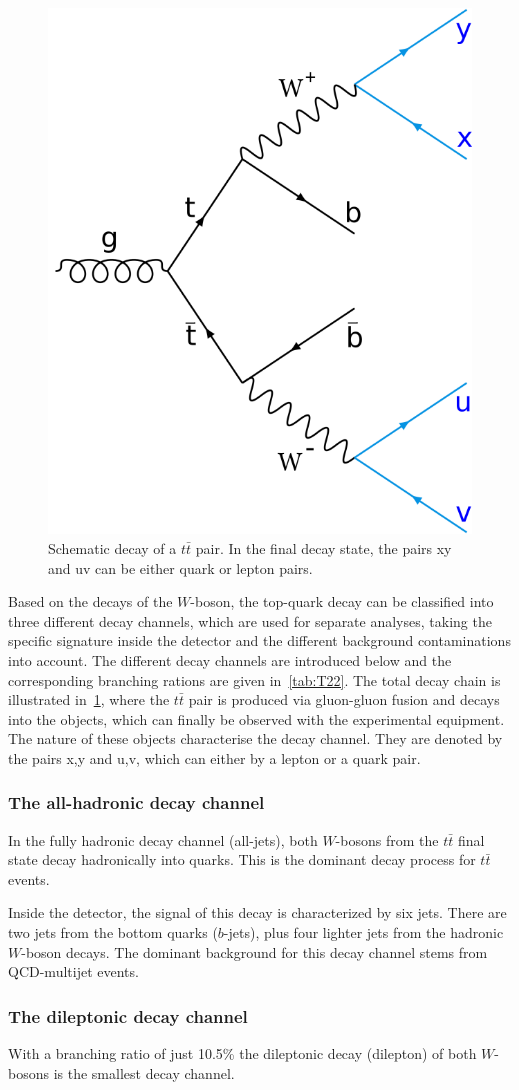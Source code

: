 \begin{figure}[h]
	\centering
	\includegraphics[width=0.3\linewidth]{Pics/cp1/Decay}
	\caption{Schematic decay of a $t\bar{t}$ pair. In the final decay state, the pairs xy and uv can be either quark or lepton pairs.  }
	\label{fig:Decay}
\end{figure}

 Based on the decays of the $W$-boson, the top-quark decay can be classified into three different decay channels, which are used for separate analyses, taking the specific signature inside the detector and the different background contaminations into account. The different decay channels are introduced below and  the corresponding branching rations are given in~\cref{tab:T22}. The total decay chain is illustrated in~\cref{fig:Decay}, where the  $t\bar{t}$ pair is produced via  gluon-gluon fusion and  decays into the objects, which can finally be observed with the experimental equipment. The nature of these objects characterise the decay channel. They are denoted by the pairs x,y and u,v, which can either by a lepton or a quark pair.




\subsubsection{The all-hadronic decay channel}
In the fully hadronic decay channel (all-jets), both $W$-bosons from the $t\bar{t}$ final state decay hadronically into quarks. This is the dominant decay process for $t\bar{t}$ events. 

 Inside the detector, the signal of this decay is characterized by six jets. There are two jets  from the bottom quarks ($b$-jets), plus four lighter jets from the hadronic $W$-boson decays. The dominant background  for this decay channel stems from QCD-multijet events.

\subsubsection{The dileptonic decay channel}
With a branching ratio of just 10.5\% the dileptonic decay (dilepton) of both $W$-bosons is the smallest decay channel. 

